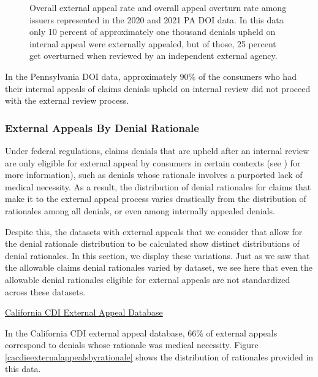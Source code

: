 \documentclass[12pt, a4paper,twoside,parskip=full]{report}
\theoremstyle{plain} %
\theoremstyle{definition} %
\theoremstyle{remark} %
\numberwithin{equation}{chapter}
\begin{document}
\begin{figure}[h!]
\begin{subfigure}[b]{0.49\textwidth}
			\end{subfigure}
			\caption{Overall external appeal rate and overall appeal overturn rate among issuers represented in the 2020 and 2021 PA DOI data. In this data only 10 percent of approximately one thousand denials upheld on internal appeal were externally appealed, but of those, 25 percent get overturned when reviewed by an independent external agency.}
			\label{paexternalappealpie}
		\end{figure}
		
		In the Pennsylvania DOI data, approximately 90\% of the consumers who had their internal appeals of claims denials upheld on internal review did not proceed with the external review process.
		
		
		\subsubsection{External Appeals By Denial Rationale}
		
		Under federal regulations, claims denials that are upheld after an internal review are only eligible for external appeal by consumers in certain contexts (see \cite{pollitz2021}) for more information), such as denials whose rationale involves a purported lack of medical necessity. As a result, the distribution of denial rationales for claims that make it to the external appeal process varies drastically from the distribution of rationales among all denials, or even among internally appealed denials.
		
		Despite this, the datasets with external appeals that we consider that allow for the denial rationale distribution to be calculated show distinct distributions of denial rationales. In this section, we display these variations. Just as we saw that the allowable claims denial rationales varied by dataset, we see here that even the allowable denial rationales eligible for external appeals are not standardized across these datasets.
		
		
		\underline{California CDI External Appeal Database}
		
		In the California CDI external appeal database, 66\% of external appeals correspond to denials whose rationale was medical necessity. Figure \ref{cacdieexternalappealsbyrationale} shows the distribution of rationales provided in this data.
		
\end{document}
